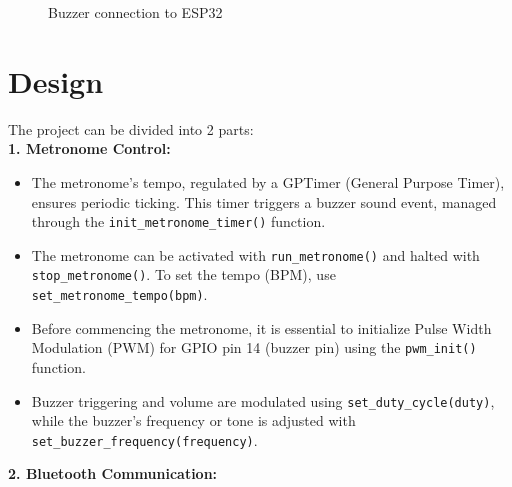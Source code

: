 \documentclass[a4paper, 11pt, a4paper]{article}
\begin{document}
\begin{figure}[ht]
    \begin{center}
    \end{center}
    \caption{Buzzer connection to ESP32}
    \label{figure:buzzer.connection}
\end{figure}


\section{Design}

The project can be divided into 2 parts:\\

\noindent\textbf{1. Metronome Control:}

\begin{itemize}
    \item The metronome's tempo, regulated by a GPTimer (General Purpose Timer), ensures periodic ticking. This timer triggers a buzzer sound event, managed through the \verb|init_metronome_timer()| function.
    \item The metronome can be activated with \verb|run_metronome()| and halted with \verb|stop_metronome()|. To set the tempo (BPM), use \verb|set_metronome_tempo(bpm)|.
    \item Before commencing the metronome, it is essential to initialize Pulse Width Modulation (PWM) for GPIO pin 14 (buzzer pin) using the \verb|pwm_init()| function.
    \item Buzzer triggering and volume are modulated using \verb|set_duty_cycle(duty)|, while the buzzer's frequency or tone is adjusted with \verb|set_buzzer_frequency(frequency)|.
\end{itemize}

\noindent\textbf{2. Bluetooth Communication:}
\end{document}
